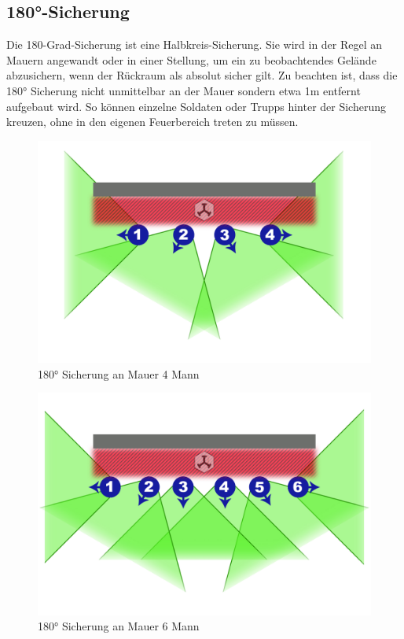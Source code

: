 \subsection{180°-Sicherung}
	Die 180-Grad-Sicherung ist eine Halbkreis-Sicherung. Sie wird in der Regel an Mauern angewandt oder in einer Stellung, um ein zu beobachtendes Gelände abzusichern, wenn der Rückraum als absolut sicher gilt. Zu beachten ist, dass die 180° Sicherung nicht unmittelbar an der Mauer sondern etwa 1m entfernt aufgebaut wird. So können einzelne Soldaten oder Trupps hinter der Sicherung kreuzen, ohne in den eigenen Feuerbereich treten zu müssen. \\
	\begin{figure}[htbp]
		\centering
		\includegraphics[width=0.8\linewidth]{./img/grundlagen/sicherungen/180grad_sicherung_4mann.jpg}
		\caption{180° Sicherung an Mauer 4 Mann}
		\end{figure}
		
		\begin{figure}[htbp]
			\centering
			\includegraphics[width=0.8\linewidth]{./img/grundlagen/sicherungen/180grad_sicherung_6mann.jpg}
			\caption{180° Sicherung an Mauer 6 Mann}
		\end{figure}
\newpage